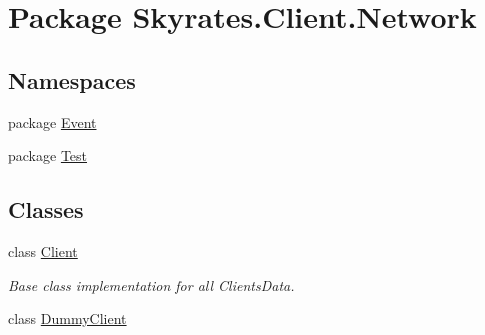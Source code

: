 \hypertarget{namespace_skyrates_1_1_client_1_1_network}{\section{Package Skyrates.\-Client.\-Network}
\label{namespace_skyrates_1_1_client_1_1_network}
}
\subsection*{Namespaces}
\begin{DoxyCompactItemize}
\item 
package \hyperlink{namespace_skyrates_1_1_client_1_1_network_1_1_event}{Event}
\item 
package \hyperlink{namespace_skyrates_1_1_client_1_1_network_1_1_test}{Test}
\end{DoxyCompactItemize}
\subsection*{Classes}
\begin{DoxyCompactItemize}
\item 
class \hyperlink{class_skyrates_1_1_client_1_1_network_1_1_client}{Client}
\begin{DoxyCompactList}\small\item\em Base class implementation for all Clients\-Data. \end{DoxyCompactList}\item 
class \hyperlink{class_skyrates_1_1_client_1_1_network_1_1_dummy_client}{Dummy\-Client}
\end{DoxyCompactItemize}
